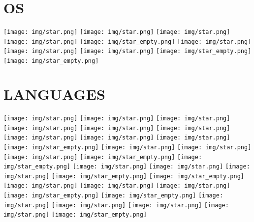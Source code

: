 \documentclass[]{cv-class}
\begin{document}
\begin{aside}
  \section{OS}
    {\texttt{[image: img/star.png]}
    \texttt{[image: img/star.png]}
    \texttt{[image: img/star.png]}
    \texttt{[image: img/star.png]}
    \texttt{[image: img/star\_empty.png]}}
    {\texttt{[image: img/star.png]}
    \texttt{[image: img/star.png]}
    \texttt{[image: img/star.png]}
    \texttt{[image: img/star\_empty.png]}
    \texttt{[image: img/star\_empty.png]}}
    ~
  \section{LANGUAGES}
    {\texttt{[image: img/star.png]}
    \texttt{[image: img/star.png]}
    \texttt{[image: img/star.png]}
    \texttt{[image: img/star.png]}
    \texttt{[image: img/star.png]}}
    {\texttt{[image: img/star.png]}
    \texttt{[image: img/star.png]}
    \texttt{[image: img/star.png]}
    \texttt{[image: img/star.png]}
    \texttt{[image: img/star\_empty.png]}}
    {\texttt{[image: img/star.png]}
    \texttt{[image: img/star.png]}
    \texttt{[image: img/star.png]}
    \texttt{[image: img/star\_empty.png]}
    \texttt{[image: img/star\_empty.png]}}       
    {\texttt{[image: img/star.png]}
    \texttt{[image: img/star.png]}
    \texttt{[image: img/star.png]}
    \texttt{[image: img/star\_empty.png]}
    \texttt{[image: img/star\_empty.png]}}
    {\texttt{[image: img/star.png]}
    \texttt{[image: img/star.png]}
    \texttt{[image: img/star.png]}
    \texttt{[image: img/star\_empty.png]}
    \texttt{[image: img/star\_empty.png]}}
    {\texttt{[image: img/star.png]}
    \texttt{[image: img/star.png]}
    \texttt{[image: img/star.png]}
    \texttt{[image: img/star.png]}
    \texttt{[image: img/star\_empty.png]}}
    ~

\end{aside}
\end{document}
